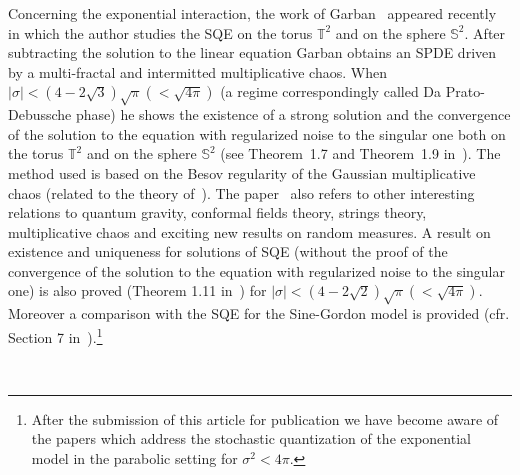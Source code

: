\documentclass[a4paper,10pt]{article}
\begin{document}
Concerning the exponential interaction, the work of
Garban~{\cite{Garban2018}} appeared recently in which the author studies the
SQE on the torus $\mathbb{T}^2$ and on the sphere $\mathbb{S}^2$. After
subtracting the solution to the linear equation Garban obtains an SPDE driven by a
multi-fractal and intermitted multiplicative chaos. When $| \sigma | < \left(
4 - 2 \sqrt{3} \right) \sqrt{\pi} \left( < \sqrt{4 \pi} \right)$ (a regime
correspondingly called Da Prato-Debussche phase) he shows the existence of a
strong solution and the convergence of the solution to the equation with
regularized noise to the singular one both on the torus $\mathbb{T}^2$ and on
the sphere $\mathbb{S}^2$ (see Theorem~1.7 and Theorem~1.9
in~{\cite{Garban2018}}). The method used is based on the Besov regularity of
the Gaussian multiplicative chaos (related to the theory of~{\cite{Ka}}). The
paper~{\cite{Garban2018}} also refers to other interesting relations to
quantum gravity, conformal fields theory, strings theory, multiplicative chaos
and exciting new results on random measures. A result on existence and
uniqueness for solutions of SQE (without the proof of the convergence of the
solution to the equation with regularized noise to the singular one) is also
proved (Theorem 1.11 in~{\cite{Garban2018}}) for $| \sigma | < \left( 4 - 2
\sqrt{2} \right) \sqrt{\pi} \left( < \sqrt{4 \pi} \right)$. Moreover a
comparison with the SQE for the Sine-Gordon model is provided (cfr. Section 7
in~{\cite{Garban2018}}).\footnote{After the submission of this article for
publication we have become aware of the papers {\cite{HoKaKu,OhTriYu}} which
address the stochastic quantization of the exponential model in the parabolic
setting for $\sigma^2 < 4 \pi$.}

\
\end{document}
